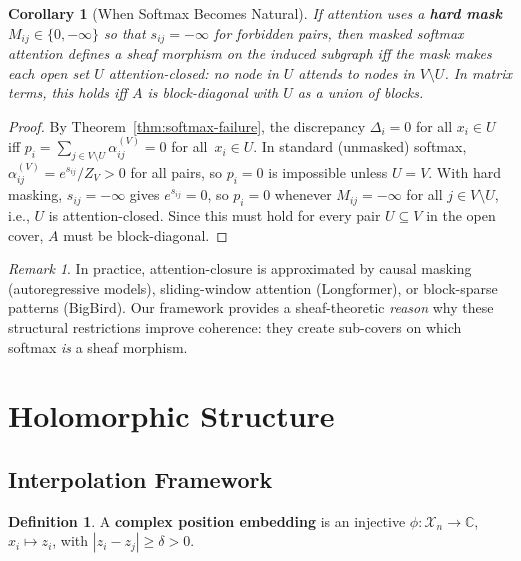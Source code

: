 \documentclass[11pt,a4paper]{article}
\theoremstyle{plain}
\newtheorem{corollary}[theorem]{Corollary}
\theoremstyle{definition}
\newtheorem{definition}[theorem]{Definition}
\theoremstyle{remark}
\newtheorem{remark}[theorem]{Remark}
\newcommand{\C}{\mathbb{C}}
\newcommand{\cX}{\mathcal{X}}
\begin{document}
\begin{corollary}[When Softmax Becomes Natural]\label{cor:block-diagonal}
If attention uses a \textbf{hard mask} $M_{ij} \in \{0, -\infty\}$ so that $s_{ij} = -\infty$ for forbidden pairs, then masked softmax attention defines a sheaf morphism on the induced subgraph iff the mask makes each open set $U$ \emph{attention-closed}: no node in $U$ attends to nodes in $V \setminus U$. In matrix terms, this holds iff $A$ is block-diagonal with $U$ as a union of blocks.
\end{corollary}

\begin{proof}
By Theorem~\ref{thm:softmax-failure}, the discrepancy $\Delta_i = 0$ for all $x_i \in U$ iff $p_i = \sum_{j \in V \setminus U} \alpha_{ij}^{(V)} = 0$ for all~$x_i \in U$. In standard (unmasked) softmax, $\alpha_{ij}^{(V)} = e^{s_{ij}}/Z_V > 0$ for all pairs, so $p_i = 0$ is impossible unless $U = V$. With hard masking, $s_{ij} = -\infty$ gives $e^{s_{ij}} = 0$, so $p_i = 0$ whenever $M_{ij} = -\infty$ for all $j \in V \setminus U$, i.e., $U$ is attention-closed. Since this must hold for every pair $U \subseteq V$ in the open cover, $A$ must be block-diagonal.
\end{proof}

\begin{remark}\label{rem:masking-practice}
In practice, attention-closure is approximated by causal masking (autoregressive models), sliding-window attention (Longformer), or block-sparse patterns (BigBird). Our framework provides a sheaf-theoretic \emph{reason} why these structural restrictions improve coherence: they create sub-covers on which softmax \emph{is} a sheaf morphism.
\end{remark}

\section{Holomorphic Structure}\label{sec:holomorphic}

\subsection{Interpolation Framework}\label{sec:interpolation}

\begin{definition}\label{def:complex-pos}
A \textbf{complex position embedding} is an injective $\phi: \cX_n \to \C$, $x_i \mapsto z_i$, with $|z_i - z_j| \geq \delta > 0$.
\end{definition}
\end{document}

